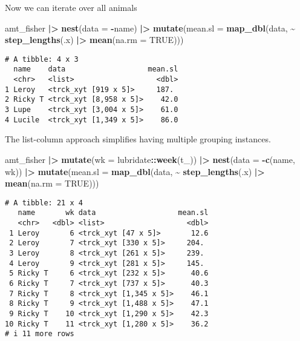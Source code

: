 \documentclass[ignorenonframetext,,t]{beamer}
\let\oldtextbf\textbf
\renewcommand{\textbf}[1]{\textcolor{spamwell}{\oldtextbf{#1}}}
\newenvironment{Shaded}{\begin{snugshade}}{\end{snugshade}}
\newcommand{\AttributeTok}[1]{\textcolor[rgb]{0.13,0.29,0.53}{#1}}
\newcommand{\ConstantTok}[1]{\textcolor[rgb]{0.56,0.35,0.01}{#1}}
\newcommand{\FunctionTok}[1]{\textcolor[rgb]{0.13,0.29,0.53}{\textbf{#1}}}
\newcommand{\NormalTok}[1]{#1}
\newcommand{\SpecialCharTok}[1]{\textcolor[rgb]{0.81,0.36,0.00}{\textbf{#1}}}
\begin{document}
\begin{frame}[fragile]
Now we can iterate over all animals

\begin{Shaded}
\begin{Highlighting}[]
\NormalTok{amt\_fisher }\SpecialCharTok{|\textgreater{}} \FunctionTok{nest}\NormalTok{(}\AttributeTok{data =} \SpecialCharTok{{-}}\NormalTok{name) }\SpecialCharTok{|\textgreater{}} 
  \FunctionTok{mutate}\NormalTok{(}\AttributeTok{mean.sl =} \FunctionTok{map\_dbl}\NormalTok{(data, }\SpecialCharTok{\textasciitilde{}} \FunctionTok{step\_lengths}\NormalTok{(.x) }\SpecialCharTok{|\textgreater{}} 
                             \FunctionTok{mean}\NormalTok{(}\AttributeTok{na.rm =} \ConstantTok{TRUE}\NormalTok{)))}
\end{Highlighting}
\end{Shaded}

\begin{verbatim}
# A tibble: 4 x 3
  name    data                   mean.sl
  <chr>   <list>                   <dbl>
1 Leroy   <trck_xyt [919 x 5]>     187. 
2 Ricky T <trck_xyt [8,958 x 5]>    42.0
3 Lupe    <trck_xyt [3,004 x 5]>    61.0
4 Lucile  <trck_xyt [1,349 x 5]>    86.0
\end{verbatim}
\end{frame}

\begin{frame}[fragile]
The list-column approach simplifies having multiple grouping instances.

\begin{Shaded}
\begin{Highlighting}[]
\NormalTok{amt\_fisher }\SpecialCharTok{|\textgreater{}} \FunctionTok{mutate}\NormalTok{(}\AttributeTok{wk =}\NormalTok{ lubridate}\SpecialCharTok{::}\FunctionTok{week}\NormalTok{(t\_)) }\SpecialCharTok{|\textgreater{}} 
  \FunctionTok{nest}\NormalTok{(}\AttributeTok{data =} \SpecialCharTok{{-}}\FunctionTok{c}\NormalTok{(name, wk)) }\SpecialCharTok{|\textgreater{}} 
  \FunctionTok{mutate}\NormalTok{(}\AttributeTok{mean.sl =} \FunctionTok{map\_dbl}\NormalTok{(data, }\SpecialCharTok{\textasciitilde{}} \FunctionTok{step\_lengths}\NormalTok{(.x) }\SpecialCharTok{|\textgreater{}} 
                             \FunctionTok{mean}\NormalTok{(}\AttributeTok{na.rm =} \ConstantTok{TRUE}\NormalTok{)))}
\end{Highlighting}
\end{Shaded}

\begin{verbatim}
# A tibble: 21 x 4
   name       wk data                   mean.sl
   <chr>   <dbl> <list>                   <dbl>
 1 Leroy       6 <trck_xyt [47 x 5]>       12.6
 2 Leroy       7 <trck_xyt [330 x 5]>     204. 
 3 Leroy       8 <trck_xyt [261 x 5]>     239. 
 4 Leroy       9 <trck_xyt [281 x 5]>     145. 
 5 Ricky T     6 <trck_xyt [232 x 5]>      40.6
 6 Ricky T     7 <trck_xyt [737 x 5]>      40.3
 7 Ricky T     8 <trck_xyt [1,345 x 5]>    46.1
 8 Ricky T     9 <trck_xyt [1,488 x 5]>    47.1
 9 Ricky T    10 <trck_xyt [1,290 x 5]>    42.3
10 Ricky T    11 <trck_xyt [1,280 x 5]>    36.2
# i 11 more rows
\end{verbatim}
\end{frame}
\end{document}
